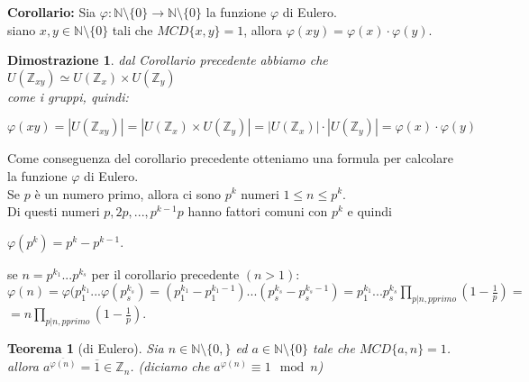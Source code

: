 \documentclass[a4paper,12pt]{article}
\theoremstyle{def}
\theoremstyle{prop}
\theoremstyle{esempio}
\theoremstyle{dimostrazione}
\newtheorem*{dimostrazione}{Dimostrazione}
\theoremstyle{teo}
\newtheorem*{teorema}{Teorema}
\theoremstyle{osservazione}
\begin{document}
\textbf{Corollario:} Sia \(\varphi : \mathbb{N} \setminus \{0\} \rightarrow \mathbb{N} \setminus \{0\}\) la funzione \(\varphi\) di Eulero.\\
siano \(x,y \in \mathbb{N} \setminus \{0\}\) tali che \(MCD\{x,y\} = 1\), allora \(\varphi(xy) = \varphi(x) \cdot \varphi(y)\).\\

\begin{dimostrazione}
    dal Corollario precedente abbiamo che \(U(\mathbb{Z}_{xy}) \simeq U(\mathbb{Z}_x) \times U(\mathbb{Z}_y)\)\\
    come i gruppi, quindi:
    \begin{center}
        \(\varphi(xy) = |U(\mathbb{Z}_{xy})| = |U(\mathbb{Z}_x) \times U(\mathbb{Z}_y)| = |U(\mathbb{Z}_x)| \cdot |U(\mathbb{Z}_y)| = \varphi(x) \cdot \varphi(y)\)
    \end{center}
\end{dimostrazione}
\newpage

Come conseguenza del corollario precedente otteniamo una formula per calcolare \\
la funzione \(\varphi\) di Eulero.\\
Se \(p\) è un numero primo, allora ci sono \(p^k\) numeri \(1 \leq n \leq p^k\).\\
Di questi numeri \(p, 2p, ... , p^{k-1}p\) hanno fattori comuni con \(p^k\) e quindi
\begin{center}
    \(\varphi(p^k) = p^k - p^{k-1}\).\\
\end{center}
se \(n = p^{k_1}...p^{k_s}\) per il corollario precedente \((n>1)\):\\
\(\varphi(n)= \varphi(p_1^{k_1}...\varphi(p_s^{k_s}) = (p_1^{k_1}-p_1^{k_1-1})...(p_s^{k_s}-p_s^{k_s-1}) = p_1^{k_1}...p_s^{k_s}\prod_{p|n, p primo}(1-\frac{1}{p}) = \)\\
\(= n \prod_{p|n, p primo}(1-\frac{1}{p})\).\\

\begin{teorema}[di Eulero]
    Sia \(n \in \mathbb{N} \setminus \{0,\}\) ed \(a \in \mathbb{N} \setminus \{0\}\) tale che \(MCD\{a,n\} = 1\).\\
    allora \(a^{\overline{\varphi(n)}} = \overline{1} \in \mathbb{Z}_n\). (diciamo che \(a^{\varphi(n)} \equiv 1 \mod n\))\\
\end{teorema}
\end{document}
